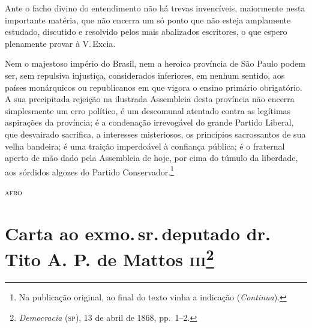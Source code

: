 Ante o facho divino do entendimento não há trevas invencíveis,
maiormente nesta importante matéria, que não encerra um só ponto que não
esteja amplamente estudado, discutido e resolvido pelos mais abalizados
escritores, o que espero plenamente provar à V.\,Excia.

Nem o majestoso império do Brasil, nem a heroica província de São Paulo
podem ser, sem repulsiva injustiça, considerados inferiores, em nenhum
sentido, aos países monárquicos ou republicanos em que vigora o ensino
primário obrigatório. A sua precipitada rejeição na ilustrada Assembleia
desta província não encerra simplesmente um erro político, é um
descomunal atentado contra as legítimas aspirações da província; é a
condenação irrevogável do grande Partido Liberal, que desvairado
sacrifica, a interesses misteriosos, os princípios sacrossantos de sua
velha bandeira; é uma traição imperdoável à confiança pública; é o
fraternal aperto de mão dado pela Assembleia de hoje, por cima do túmulo
da liberdade, aos sórdidos algozes do Partido Conservador.\footnote{Na publicação original, ao final do texto vinha a indicação (\emph{Continua}).}

\begin{flushright}
\textsc{afro}
\end{flushright}

\chapter{Carta ao exmo.\,sr.\,deputado dr.\,Tito A. P. de Mattos
\textsc{iii}\footnote{\emph{Democracia} (\textsc{sp}), 13 de abril de 1868, pp.~1--2.}}

